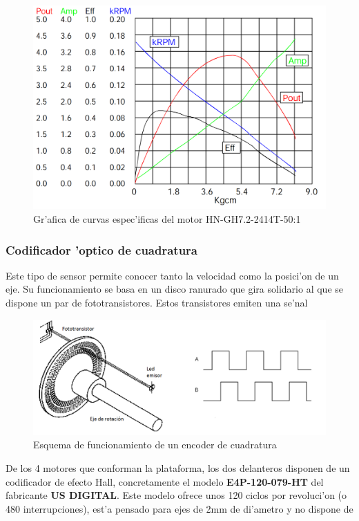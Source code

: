\documentclass[twoside,12pt]{article}
\begin{document}
\begin{figure}[ht]
\centering
\includegraphics[scale=0.35]{images/motor_graph.png} 
\caption{Gr'afica de curvas espec'ificas del motor HN-GH7.2-2414T-50:1}
\label{fig:Gr'afica del Motor}
\end{figure}

\subsubsection{Codificador 'optico de cuadratura}
Este tipo de sensor permite conocer tanto la velocidad como la posici'on de un eje. Su funcionamiento se basa en un disco ranurado que gira solidario al que se dispone un par de fototransistores. Estos transistores emiten una se'nal 

\begin{figure}[ht]
\centering
\includegraphics[scale=0.45]{images/encoderQEI.png} 
\caption{Esquema de funcionamiento de un encoder de cuadratura}
\label{fig:Esquema QEI}
\end{figure}

De los 4 motores que conforman la plataforma, los dos delanteros disponen de un codificador de efecto Hall, concretamente el modelo \textbf{E4P-120-079-HT} del fabricante \textbf{US DIGITAL}. Este modelo ofrece unos 120 ciclos por revoluci'on (o 480 interrupciones), est'a pensado para ejes de 2mm de di'ametro y no dispone de 
\end{document}
